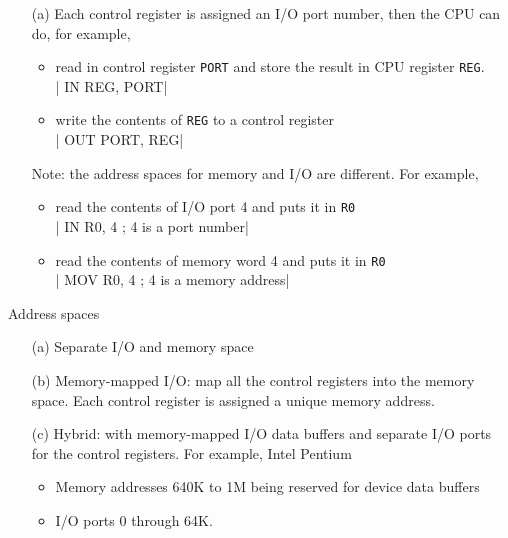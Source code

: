 \begin{frame}[fragile]
  \begin{itemize}
  \item[(a)] Each control register is assigned an I/O port number, then the CPU can do, for
    example,
    \begin{itemize}
    \item read in control register \texttt{PORT} and store the result in CPU register
      \texttt{REG}.\\
      |    IN REG, PORT|
    \item write the contents of \texttt{REG} to a control register\\
      |    OUT PORT, REG|
    \end{itemize}
    \alert{Note:} the address spaces for memory and I/O are different. For example,
    \begin{itemize}
    \item read the contents of I/O port 4 and puts it in \texttt{R0}\\
      |     IN R0, 4 ; 4 is a port number|
    \item read the contents of memory word 4 and puts it in \texttt{R0}\\
      |    MOV R0, 4 ; 4 is a memory address|
    \end{itemize}
  \end{itemize}
\end{frame}

\begin{frame}{Address spaces}
  \begin{center}
     
  \end{center}
  \begin{itemize}
  \item[(a)] Separate I/O and memory space
  \item[(b)] \alert{Memory-mapped I/O:} map all the control registers into the memory
    space. Each control register is assigned a unique memory address.
  \item[(c)] \alert{Hybrid:} with memory-mapped I/O data buffers and separate I/O ports
    for the control registers. For example, Intel Pentium
    \begin{itemize}
    \item Memory addresses 640K to 1M being reserved for device data buffers
    \item I/O ports 0 through 64K.
    \end{itemize}
  \end{itemize}
\end{frame}

